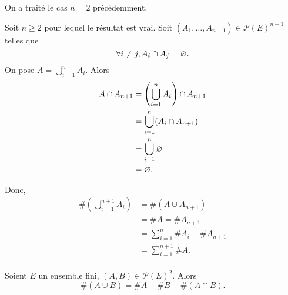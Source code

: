 \begin{prv}

	On a traité le cas $n = 2$ précédemment.

	Soit $n \ge 2$ pour lequel le résultat est vrai. Soit $(A_1, \ldots, A_{n+1}) \in \mathcal{P}(E)^{n+1}$ telles que \[
		\forall i \neq j, A_i \cap A_j = \varnothing.
	\]
	On pose $A = \bigcup_{i=1}^n A_i$. Alors
	\begin{align*}
		A \cap A_{n+1} &= \left( \bigcup_{i=1}^n A_i \right) \cap A_{n+1} \\
		&= \bigcup_{i=1}^n (A_i \cap A_{n+1}) \\
		&= \bigcup_{i=1}^n \varnothing \\
		&= \varnothing. \\
	\end{align*}

	Donc, 
	\begin{align*}
		\#(\bigcup_{i=1}^{n+1}A_i) &= \#(A\cup A_{n+1}) \\
		&= \#A = \#A_{n+1} \\
		&= \sum_{i=1}^n \#A_i + \#A_{n+1} \\
		&= \sum_{i=1}^{n+1}\#A. \\
	\end{align*}
\end{prv}

\begin{prop}
	Soient $E$ un ensemble fini, $(A,B) \in \mathcal{P}(E)^2$. Alors \[
		\#(A\cup B) = \#A + \#B - \#(A\cap B).
	\]
\end{prop}


